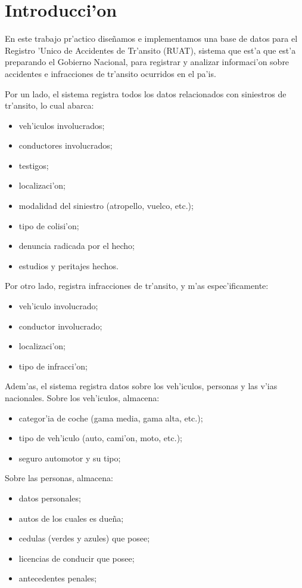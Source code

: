 \section{Introducci'on}

En este trabajo pr'actico dise\~{n}amos e implementamos una base de datos para el Registro 'Unico de Accidentes de Tr'ansito (RUAT), sistema que est'a que est'a preparando el Gobierno Nacional, para registrar y analizar informaci'on sobre accidentes e infracciones de tr'ansito ocurridos en el pa'is.

Por un lado, el sistema registra todos los datos relacionados con siniestros de tr'ansito, lo cual abarca:
\begin{itemize}
\item veh'iculos involucrados;
\item conductores involucrados;
\item testigos;
\item localizaci'on;
\item modalidad del siniestro (atropello, vuelco, etc.);
\item tipo de colisi'on;
\item denuncia radicada por el hecho;
\item estudios y peritajes hechos.
\end{itemize}

Por otro lado, registra infracciones de tr'ansito, y m'as espec'ificamente:

\begin{itemize}
\item veh'iculo involucrado;
\item conductor involucrado;
\item localizaci'on;
\item tipo de infracci'on;
\end{itemize}

Adem'as, el sistema registra datos sobre los veh'iculos, personas y las v'ias nacionales. Sobre los veh'iculos, almacena:

\begin{itemize}
\item categor'ia de coche (gama media, gama alta, etc.);
\item tipo de veh'iculo (auto, cami'on, moto, etc.);
\item seguro automotor y su tipo;
\end{itemize}

Sobre las personas, almacena:

\begin{itemize}
\item datos personales;
\item autos de los cuales es due\~{n}a;
\item cedulas (verdes y azules) que posee;
\item licencias de conducir que posee;
\item antecedentes penales;
\end{itemize}

